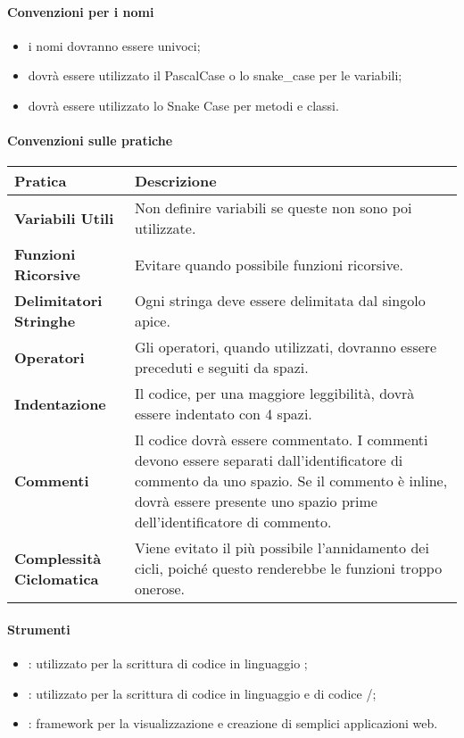 		\paragraph{Convenzioni per i nomi} 
		\begin{itemize}
			\item i nomi dovranno essere univoci;
			\item dovrà essere utilizzato il PascalCase o lo snake\_case per le variabili;
			\item dovrà essere utilizzato lo Snake Case per metodi e classi. 
		\end{itemize}
			
		\paragraph{Convenzioni sulle pratiche} \hfill \break
    \newline
		\begin{tabular}{ |m{15em}|m{25em}| }
			\hline
		  \textbf{Pratica}			& \textbf{Descrizione}\\
			\hline
			\textbf{Variabili Utili}		& Non definire variabili se queste non sono poi utilizzate.\\
			\hline
			\textbf{Funzioni Ricorsive}		& Evitare quando possibile funzioni ricorsive.\\
			\hline
			\textbf{Delimitatori Stringhe}	& Ogni stringa deve essere delimitata dal singolo apice.\\
			\hline
			\textbf{Operatori}			& Gli operatori, quando utilizzati, dovranno essere preceduti e seguiti da spazi.\\
			\hline
			\textbf{Indentazione}			& Il codice, per una maggiore leggibilità, dovrà essere indentato con 4 spazi.\\ %
			\hline
			\textbf{Commenti}			& Il codice dovrà essere commentato. I commenti devono essere separati dall'identificatore di commento da uno spazio. Se il commento è inline, dovrà essere presente uno spazio prime dell'identificatore di commento.\\
			\hline
			\textbf{Complessità Ciclomatica}& Viene evitato il più possibile l'annidamento dei cicli, poiché questo renderebbe le funzioni troppo onerose.\\
			\hline
    \end{tabular}
		
		\paragraph{Strumenti} \hfill \break
		\begin{itemize}
      \item \textbf{}: utilizzato per la scrittura di codice in linguaggio ;
      \item \textbf{}: utilizzato per la scrittura di codice in linguaggio  e di codice /;
      \item \textbf{}: framework  per la visualizzazione e creazione di semplici applicazioni web.
    \end{itemize}

